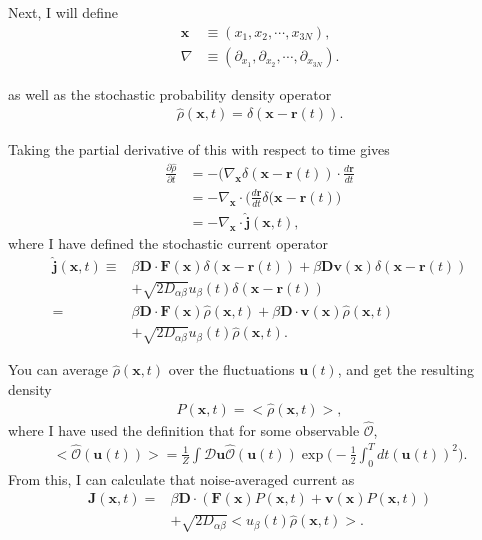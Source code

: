 \documentclass[twocolumn,amsmath,amssymb,aps]{revtex4-1}%
\begin{document}
Next, I will define
\begin{align}
  \bm{x}&\equiv(x_1,x_2,\cdots,x_{3N}),\\
  \nabla&\equiv(\partial_{x_1},\partial_{x_2},\cdots,\partial_{x_{3N}}).
\end{align}

as well as the stochastic probability density operator
\begin{align}
  \hat{\rho}(\bm{x},t)=\delta(\bm{x}-\bm{r}(t)).
\end{align}

Taking the partial derivative of this with respect to time gives
\begin{align}
  \frac{\partial\hat{\rho}}{\partial t}
  &=-(\nabla_{\bm{x}}\delta(\bm{x}-\bm{r}(t))
  \cdot\frac{d\bm{r}}{dt}\nonumber\\
  &=-\nabla_{\bm{x}}\cdot\bigg(\frac{d\bm{r}}{dt}
  \delta(\bm{x}-\bm{r}(t)\bigg)\nonumber\\
  &=-\nabla_{\bm{x}}\cdot\hat{\bm{j}}(\bm{x},t),
\end{align}
where I have defined the stochastic current operator
\begin{align}
  \hat{\bm{j}}(\bm{x},t)\equiv
  &\beta\bm{D}\cdot\bm{F}(\bm{x})\delta(\bm{x}-\bm{r}(t))
  +\beta\bm{D}\bm{v}(\bm{x})\delta(\bm{x}-\bm{r}(t))\nonumber\\
  &+\sqrt{2D_{\alpha\beta}}u_{\beta}(t)
  \delta(\bm{x}-\bm{r}(t))\nonumber\\
  =&\beta\bm{D}\cdot\bm{F}(\bm{x})\hat{\rho}(\bm{x},t)
  +\beta\bm{D}\cdot\bm{v}(\bm{x})\hat{\rho}(\bm{x},t)\nonumber\\
  &+\sqrt{2D_{\alpha\beta}}u_{\beta}(t)\hat{\rho}(\bm{x},t).
\end{align}

You can average $\hat{\rho}(\bm{x},t)$ over the fluctuations $\bm{u}(t)$, and
get the resulting density
\begin{align}
  P(\bm{x},t)=<\hat{\rho}(\bm{x},t)>,
\end{align}
where I have used the definition that for some observable $\hat{\mathcal{O}}$,
\begin{align}
  <\hat{\mathcal{O}}(\bm{u}(t))>=\frac{1}{Z}\int\mathcal{D}\bm{u}
  \hat{\mathcal{O}}(\bm{u}(t))
  \exp\bigg(-\frac{1}{2}\int_0^Tdt(\bm{u}(t))^2\bigg).
\end{align}
From this, I can calculate that noise-averaged current as
\begin{align}
  \bm{J}(\bm{x},t)=
  &\beta\bm{D}\cdot(\bm{F}(\bm{x})P(\bm{x},t)
  +\bm{v}(\bm{x})P(\bm{x},t))\nonumber\\
  &+\sqrt{2D_{\alpha\beta}}<u_{\beta}(t)\hat{\rho}(\bm{x},t)>.
\end{align}
\end{document}
